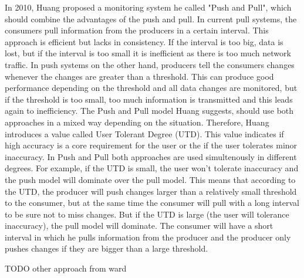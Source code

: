 In 2010, Huang \cite{He_2010} proposed a monitoring system he called "Push and Pull", which should combine the advantages of the push and pull. In current pull systems, the consumers pull information from the producers in a certain interval. This approach is efficient but lacks in consistency. If the interval is too big, data is lost, but if the interval is too small it is inefficient as there is too much network traffic. In push systems on the other hand, producers tell the consumers changes whenever the changes are greater than a threshold. This can produce good performance depending on the threshold and all data changes are monitored, but if the threshold is too small, too much information is transmitted and this leads again to inefficiency. The Push and Pull model Huang suggests, should use both approaches in a mixed way depending on the situation. Therefore, Huang introduces a value called User Tolerant Degree (UTD). This value indicates if high accuracy is a core requirement for the user or the if the user tolerates minor inaccuracy. In Push and Pull both approaches are used simultenously in different degrees. For example, if the UTD is small, the user won't tolerate inaccuracy and the push model will dominate over the pull model. This means that according to the UTD, the producer will push changes larger than a relatively small threshold to the consumer, but at the same time the consumer will pull with a long interval to be sure not to miss changes. But if the UTD is large (the user will tolerance inaccuracy), the pull model will dominate. The consumer will have a short interval in which he pulls information from the producer and the producer only pushes changes if they are bigger than a large threshold.

TODO other approach from ward